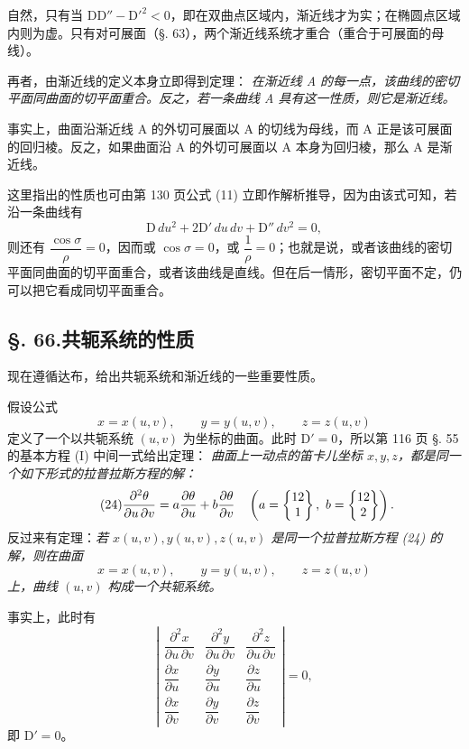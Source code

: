 自然，只有当 \(\mathrm{D}\mathrm{D''}-\mathrm{D'}^2<0\)，即在双曲点区域内，渐近线才为实；在椭圆点区域内则为虚。只有对可展面（§. 63），两个渐近线系统才重合（重合于可展面的母线）。

再者，由渐近线的定义本身立即得到定理：
\emph{在渐近线 A 的每一点，该曲线的密切平面同曲面的切平面重合。反之，若一条曲线 A 具有这一性质，则它是渐近线。}

事实上，曲面沿渐近线 A 的外切可展面以 A 的切线为母线，而 A 正是该可展面的回归棱。反之，如果曲面沿 A 的外切可展面以 A 本身为回归棱，那么 A 是渐近线。

这里指出的性质也可由第 130 页公式 (11) 立即作解析推导，因为由该式可知，若沿一条曲线有
\[
\mathrm{D}\,du^2+2\mathrm{D'}\,du\,dv+\mathrm{D''}\,dv^2=0,
\]
则还有 \(\dfrac{\cos\sigma}{\rho}=0\)，因而或 \(\cos\sigma=0\)，或 \(\dfrac{1}{\rho}=0\)；也就是说，或者该曲线的密切平面同曲面的切平面重合，或者该曲线是直线。但在后一情形，密切平面不定，仍可以把它看成同切平面重合。

\subsection*{§. 66.\quad 共轭系统的性质}

现在遵循达布，给出共轭系统和渐近线的一些重要性质。

假设公式
\[
x=x(u,v), \qquad y=y(u,v), \qquad z=z(u,v)
\]
定义了一个以共轭系统 \((u,v)\) 为坐标的曲面。此时 \(\mathrm{D'}=0\)，所以第 116 页 §. 55 的基本方程 (I) 中间一式给出定理：
\emph{曲面上一动点的笛卡儿坐标 \(x,y,z\)，都是同一个如下形式的拉普拉斯方程的解：}
\begin{equation}\tag{24}
\frac{\partial^2\theta}{\partial u\,\partial v}=a\frac{\partial\theta}{\partial u}+b\frac{\partial\theta}{\partial v}\quad
\left(a=\left\{\begin{matrix}12\\1\end{matrix}\right\},\ b=\left\{\begin{matrix}12\\2\end{matrix}\right\}\right).
\end{equation}
反过来有定理：\emph{若 \(x(u,v),y(u,v),z(u,v)\) 是同一个拉普拉斯方程 (24) 的解，则在曲面}
\[
x=x(u,v), \qquad y=y(u,v), \qquad z=z(u,v)
\]
\emph{上，曲线 \((u,v)\) 构成一个共轭系统。}

事实上，此时有
\[
\left|
\begin{matrix}
\dfrac{\partial^2x}{\partial u\,\partial v} & \dfrac{\partial^2y}{\partial u\,\partial v} & \dfrac{\partial^2z}{\partial u\,\partial v}\\[0.5em]
\dfrac{\partial x}{\partial u} & \dfrac{\partial y}{\partial u} & \dfrac{\partial z}{\partial u}\\[0.5em]
\dfrac{\partial x}{\partial v} & \dfrac{\partial y}{\partial v} & \dfrac{\partial z}{\partial v}
\end{matrix}
\right|=0,
\]
即 \(\mathrm{D'}=0\)。

